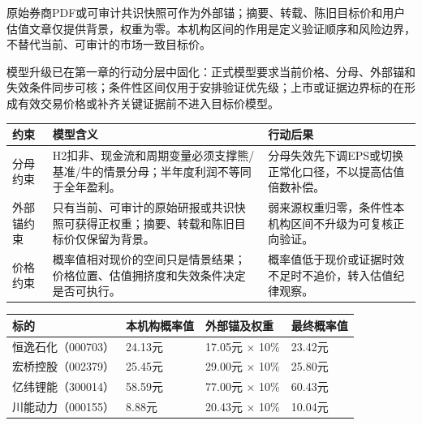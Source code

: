 \noindent
\begin{sourcequalitybox}[外部锚与本机构区间的边界]
原始券商PDF或可审计共识快照可作为外部锚；摘要、转载、陈旧目标价和用户估值文章仅提供背景，权重为零。本机构区间的作用是定义验证顺序和风险边界，不替代当前、可审计的市场一致目标价。
\end{sourcequalitybox}

模型升级已在第一章的行动分层中固化：正式模型要求当前价格、分母、外部锚和失效条件同步可核；条件性区间仅用于安排验证优先级；上市或证据边界标的在形成有效交易价格或补齐关键证据前不进入目标价模型。

\noindent
\begin{exhibitbox}
\small
\begin{tabularx}{\textwidth}{L{2.2cm}X L{4.6cm}}
\toprule
\textbf{约束} & \textbf{模型含义} & \textbf{行动后果} \\
\midrule
分母约束 & H2扣非、现金流和周期变量必须支撑熊/基准/牛的情景分母；半年度利润不等同于全年盈利。 & 分母失效先下调EPS或切换正常化口径，不以提高估值倍数补偿。 \\
外部锚约束 & 只有当前、可审计的原始研报或共识快照可获得正权重；摘要、转载和陈旧目标价仅保留为背景。 & 弱来源权重归零，条件性本机构区间不升级为可复核正向验证。 \\
价格约束 & 概率值相对现价的空间只是情景结果；价格位置、估值拥挤度和失效条件决定是否可执行。 & 概率值低于现价或证据时效不足时不追价，转入估值纪律观察。 \\
\bottomrule
\end{tabularx}
\normalsize
{}
\end{exhibitbox}

\noindent
\begin{exhibitbox}
\small
\begin{tabularx}{\textwidth}{L{2.5cm}R{2.4cm}L{4.1cm}R{2.4cm}}
\toprule
\textbf{标的} & \textbf{本机构概率值} & \textbf{外部锚及权重} & \textbf{最终概率值} \\
\midrule
恒逸石化（000703） & 24.13元 & 17.05元 × 10\% & 23.42元 \\
宏桥控股（002379） & 25.45元 & 29.00元 × 10\% & 25.80元 \\
亿纬锂能（300014） & 58.59元 & 77.00元 × 10\% & 60.43元 \\
川能动力（000155） & 8.88元 & 20.43元 × 10\% & 10.04元 \\
\bottomrule
\end{tabularx}
\normalsize
{}
\end{exhibitbox}
